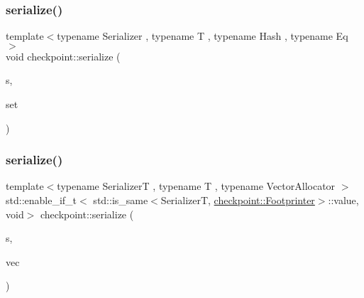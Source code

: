 \mbox{\label{namespacecheckpoint_a64c8a1aa29d469bc71c88a8836264ecc}} 
\subsubsection{\texorpdfstring{serialize()}{serialize()}\hspace{0.1cm}{\footnotesize\ttfamily [27/29]}}
{\footnotesize\ttfamily template$<$typename Serializer , typename T , typename Hash , typename Eq $>$ \\
void checkpoint\+::serialize (\begin{DoxyParamCaption}\item[{\hyperlink{structcheckpoint_1_1_serializer}{Serializer} \&}]{s,  }\item[{std\+::unordered\+\_\+multiset$<$ T, Hash, Eq $>$ \&}]{set }\end{DoxyParamCaption})\hspace{0.3cm}{\ttfamily [inline]}}

\mbox{\label{namespacecheckpoint_a3f43839a02cd77538b0d2f4192e926be}} 
\subsubsection{\texorpdfstring{serialize()}{serialize()}\hspace{0.1cm}{\footnotesize\ttfamily [28/29]}}
{\footnotesize\ttfamily template$<$typename SerializerT , typename T , typename Vector\+Allocator $>$ \\
std\+::enable\+\_\+if\+\_\+t$<$ std\+::is\+\_\+same$<$SerializerT, \hyperlink{structcheckpoint_1_1_footprinter}{checkpoint\+::\+Footprinter}$>$\+::value, void$>$ checkpoint\+::serialize (\begin{DoxyParamCaption}\item[{SerializerT \&}]{s,  }\item[{std\+::vector$<$ T, Vector\+Allocator $>$ \&}]{vec }\end{DoxyParamCaption})}

\mbox{\label{namespacecheckpoint_af95ab4d3ad37bb33b284e3a51047d685}} 
